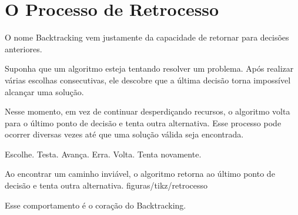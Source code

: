 \section{O Processo de Retrocesso}

O nome Backtracking vem justamente da capacidade de retornar para decisões anteriores.

Suponha que um algoritmo esteja tentando resolver um problema. Após realizar várias escolhas consecutivas, ele descobre que a última decisão torna impossível alcançar uma solução.

Nesse momento, em vez de continuar desperdiçando recursos, o algoritmo volta para o último ponto de decisão e tenta outra alternativa. Esse processo pode ocorrer diversas vezes até que uma solução válida seja encontrada.

\begin{passos}
Escolhe. Testa. Avança. Erra. Volta. Tenta novamente.
\end{passos}

%
  {Ao encontrar um caminho inviável, o algoritmo retorna ao último ponto de decisão e tenta outra alternativa.}%
  {figuras/tikz/retrocesso}

\begin{ideiachave}
Esse comportamento é o coração do Backtracking.
\end{ideiachave}
